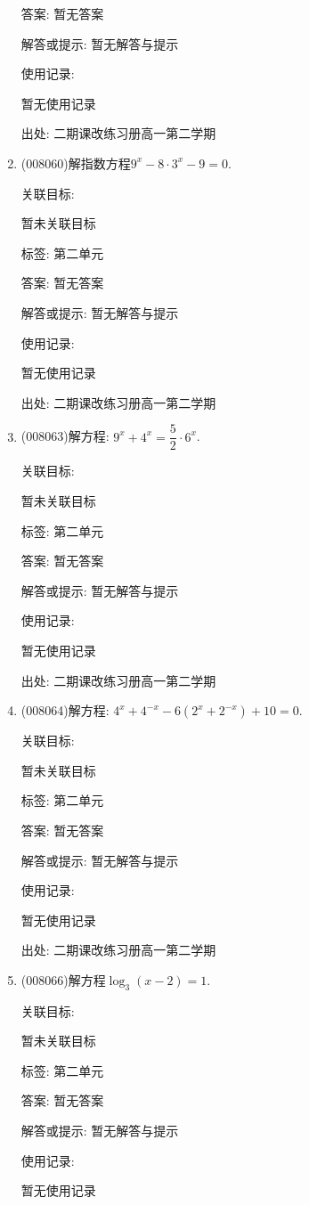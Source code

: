 \documentclass[10pt,a4paper]{article}
\begin{document}
\begin{enumerate}[1.]
答案: 暂无答案

解答或提示: 暂无解答与提示

使用记录:

暂无使用记录


出处: 二期课改练习册高一第二学期
\item { (008060)}解指数方程$9^x-8\cdot 3^x-9=0$.


关联目标:

暂未关联目标



标签: 第二单元

答案: 暂无答案

解答或提示: 暂无解答与提示

使用记录:

暂无使用记录


出处: 二期课改练习册高一第二学期
\item { (008063)}解方程: $9^x+4^x=\dfrac 52\cdot 6^x$.


关联目标:

暂未关联目标



标签: 第二单元

答案: 暂无答案

解答或提示: 暂无解答与提示

使用记录:

暂无使用记录


出处: 二期课改练习册高一第二学期
\item { (008064)}解方程: $4^x+4^{-x}-6(2^x+2^{-x})+10=0$.


关联目标:

暂未关联目标



标签: 第二单元

答案: 暂无答案

解答或提示: 暂无解答与提示

使用记录:

暂无使用记录


出处: 二期课改练习册高一第二学期
\item { (008066)}解方程$\log _3(x-2)=1$.


关联目标:

暂未关联目标



标签: 第二单元

答案: 暂无答案

解答或提示: 暂无解答与提示

使用记录:

暂无使用记录



\end{enumerate}
\end{document}
